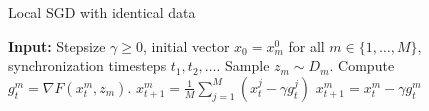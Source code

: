 \begin{algorithm}
    \caption{Local SGD with identical data}
    \begin{algorithmic}[1]
        \State \textbf{Input:} Stepsize $\gamma \geq 0$, initial vector $x_0 = x_m^0$ for all $m \in \{1, \ldots, M\}$, synchronization timesteps $t_1, t_2, \ldots$.
                \State Sample $z_m \sim D_m$.
                \State Compute $g_t^m = \nabla F(x_t^m, z_m)$.
            \EndFor
                \State $x^m_{t+1} = \frac{1}{M} \sum^M_{j = 1} (x^j_t - \gamma g^j_t) $
            \Else
                \State $x^m_{t+1} = x_t^m - \gamma g_t^m$ \label{eq:upd_eq}
            \EndIf
        \EndFor
    \end{algorithmic}
\end{algorithm}